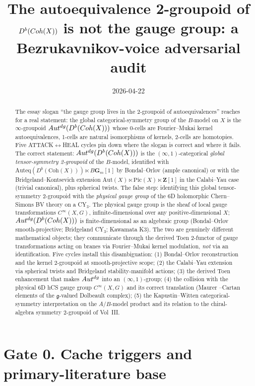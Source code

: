 \documentclass[11pt]{amsart}
\title{The autoequivalence 2-groupoid of $D^b(\Coh(X))$ is not the gauge
group: a Bezrukavnikov-voice adversarial audit}
\author{}
\date{2026-04-22}
\theoremstyle{definition}
\providecommand{\Coh}{\mathrm{Coh}}
\providecommand{\Aut}{\mathrm{Aut}}
\providecommand{\Auteq}{\mathrm{Auteq}}
\providecommand{\Autdg}{\mathrm{Aut}^{\rm dg}}
\providecommand{\Pic}{\mathrm{Pic}}
\providecommand{\fg}{\mathfrak{g}}
\providecommand{\bZ}{\mathbf{Z}}
\providecommand{\bG}{\mathbf{G}}
\begin{document}
\maketitle

\begin{abstract}
The essay slogan ``the gauge group lives in the 2-groupoid of
autoequivalences'' reaches for a real statement: the global
categorical-symmetry group of the $B$-model on $X$ is the
$\infty$-groupoid $\Autdg(D^b(\Coh(X)))$ whose 0-cells are
Fourier--Mukai kernel autoequivalences, 1-cells are natural
isomorphisms of kernels, 2-cells are homotopies. Five
ATTACK$\leftrightarrow$HEAL cycles pin down where the slogan is
correct and where it fails. The correct statement: $\Autdg(D^b(\Coh(X)))$
is the $(\infty,1)$-categorical \emph{global tensor-symmetry
2-groupoid} of the $B$-model, identified with
$\Auteq(D^b(\Coh(X))) \ltimes B\bG_m[1]$ by Bondal--Orlov (ample
canonical) or with the Bridgeland--Kontsevich extension
$\Aut(X) \ltimes \Pic(X) \ltimes \bZ[1]$ in the Calabi--Yau case
(trivial canonical), plus spherical twists. The false step: identifying
this global tensor-symmetry 2-groupoid with the \emph{physical gauge
group} of the 6D holomorphic Chern--Simons BV theory on a CY$_3$. The
physical gauge group is the sheaf of local gauge transformations
$C^\infty(X, G)$, infinite-dimensional over any positive-dimensional
$X$; $\Autdg(D^b(\Coh(X)))$ is finite-dimensional as an algebraic
group (Bondal--Orlov smooth-projective; Bridgeland CY$_3$; Kawamata
K3). The two are genuinely different mathematical objects; they
communicate through the derived Toen 2-functor of gauge
transformations acting on branes via Fourier--Mukai kernel modulation,
\emph{not} via an identification. Five cycles install this
disambiguation: (1) Bondal--Orlov reconstruction and the kernel
2-groupoid at smooth-projective scope; (2) the Calabi--Yau extension
via spherical twists and Bridgeland stability-manifold actions;
(3) the derived Toen enhancement that makes $\Autdg$ into an
$(\infty,1)$-group; (4) the collision with the physical 6D hCS
gauge group $C^\infty(X, G)$ and its correct translation (Maurer
--Cartan elements of the $\fg$-valued Dolbeault complex); (5) the
Kapustin--Witten categorical-symmetry interpretation on the
$A$/$B$-model product and its relation to the chiral-algebra
symmetry 2-groupoid of Vol~III.
\end{abstract}

\section*{Gate 0. Cache triggers and primary-literature base}
\end{document}
